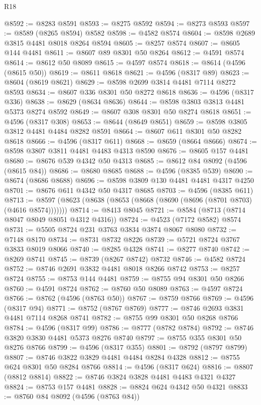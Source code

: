 \begin{lexlean}{R18}
\begin{coremodule}
@8592 := @8283 @8591
@8593 := @8275 @8592
@8594 := @8273 @8593
@8597 := @8589 (@8265 @8594) @8582
@8598 := @4582 @8574
@8604 := @8598 @2689 @3815 @4481 @8018 @8264 @8594
@8605 := @8257 @8574
@8607 := @8605 @144 @4481
@8611 := @8607 @89 @8301 @50 @8264
@8612 := @4591 @8574
@8614 := @8612 @50 @8089
@8615 := @4597 @8574
@8618 := @8614 (@4596 (@8615 @50))
@8619 := @8611 @8618
@8621 := @4596 (@8317 @89)
@8623 := @8604 (@8619 @8621)
@8629 := @8598 @2699 @3814 @4481 @7114 @8272 @8593
@8634 := @8607 @336 @8301 @50 @8272 @8618
@8636 := @4596 (@8317 @336)
@8638 := @8629 (@8634 @8636)
@8644 := @8598 @3803 @3813 @4481 @5373 @8274 @8592
@8649 := @8607 @308 @8301 @50 @8274 @8618
@8651 := @4596 (@8317 @308)
@8653 := @8644 (@8649 @8651)
@8659 := @8598 @3805 @3812 @4481 @4484 @8282 @8591
@8664 := @8607 @611 @8301 @50 @8282 @8618
@8666 := @4596 (@8317 @611)
@8668 := @8659 (@8664 @8666)
@8674 := @8598 @3807 @3811 @4481 @4483 @4313 @8590
@8676 := @8605 @157 @4481
@8680 := @8676 @539 @4342 @50 @4313
@8685 := @8612 @84 @8092 (@4596 (@8615 @84))
@8686 := @8680 @8685
@8688 := @4596 (@8385 @539)
@8690 := @8674 (@8686 @8688)
@8696 := @8598 @3809 @130 @4481 @4481 @4317 @4250
@8701 := @8676 @611 @4342 @50 @4317 @8685
@8703 := @4596 (@8385 @611)
@8713 := @8597 (@8623 (@8638 (@8653 (@8668 (@8690 (@8696 (@8701 @8703) (@4616 @8574)))))))
@8714 := @8413 @8045
@8721 := @8584 (@8713 (@8714 @8047 @8049 @8051 @4312 @4316))
@8724 := @4523 (@7172 @8582) @8574
@8731 := @5505 @8724 @231 @3763 @3834 @3874 @8067 @8080
@8732 := @7148 @8170
@8734 := @8731 @8732 @8226
@8739 := @5721 @8724 @3767 @3833 @8019 @8066
@8740 := @8285 @4328
@8741 := @8277 @8740
@8742 := @8269 @8741
@8745 := @8739 (@8267 @8742) @8732
@8746 := @4582 @8724
@8752 := @8746 @2691 @3832 @4481 @8018 @8266 @8742
@8753 := @8257 @8724
@8755 := @8753 @144 @4481
@8759 := @8755 @94 @8301 @50 @8266
@8760 := @4591 @8724
@8762 := @8760 @50 @8089
@8763 := @4597 @8724
@8766 := @8762 (@4596 (@8763 @50))
@8767 := @8759 @8766
@8769 := @4596 (@8317 @94)
@8771 := @8752 (@8767 @8769)
@8777 := @8746 @2693 @3831 @4481 @7114 @8268 @8741
@8782 := @8755 @99 @8301 @50 @8268 @8766
@8784 := @4596 (@8317 @99)
@8786 := @8777 (@8782 @8784)
@8792 := @8746 @3820 @3830 @4481 @5373 @8276 @8740
@8797 := @8755 @355 @8301 @50 @8276 @8766
@8799 := @4596 (@8317 @355)
@8801 := @8792 (@8797 @8799)
@8807 := @8746 @3822 @3829 @4481 @4484 @8284 @4328
@8812 := @8755 @624 @8301 @50 @8284 @8766
@8814 := @4596 (@8317 @624)
@8816 := @8807 (@8812 @8814)
@8822 := @8746 @3824 @3828 @4481 @4483 @4321 @4327
@8824 := @8753 @157 @4481
@8828 := @8824 @624 @4342 @50 @4321
@8833 := @8760 @84 @8092 (@4596 (@8763 @84))

\end{coremodule}
\end{lexlean}

